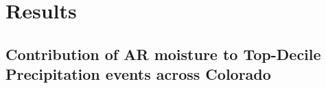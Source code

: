 \documentclass[draft]{agujournal2019}
\begin{document}
\section{Results}

\subsection{Contribution of AR moisture to Top-Decile Precipitation events across Colorado}
\label{sec:results:contribution}
\end{document}
